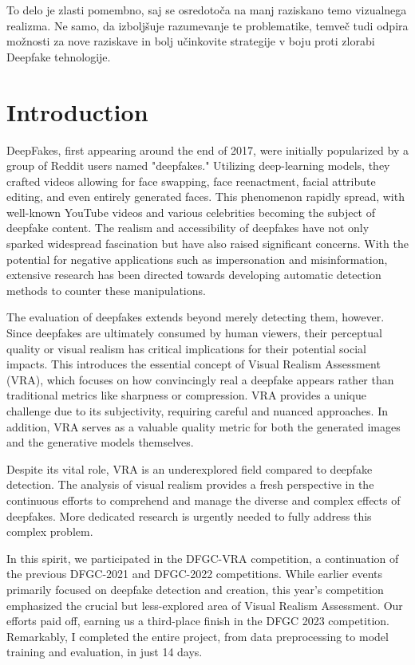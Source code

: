 \documentclass[a4paper,12pt,openright]{book}
\newcommand{\clearemptydoublepage}{\newpage{\pagestyle{empty}\cleardoublepage}}
\begin{document}
To delo je zlasti pomembno, saj se osredotoča na manj raziskano temo vizualnega realizma. Ne samo, da izboljšuje razumevanje te problematike, temveč tudi odpira možnosti za nove raziskave in bolj učinkovite strategije v boju proti zlorabi Deepfake tehnologije.


\bigskip

\clearemptydoublepage


\mainmatter
\setcounter{page}{1}
\pagestyle{fancy}

\chapter{Introduction}
\label{chap:introduction}
DeepFakes, first appearing around the end of 2017, were initially popularized by a group of Reddit users named "deepfakes." Utilizing deep-learning models, they crafted videos allowing for face swapping, face reenactment, facial attribute editing, and even entirely generated faces. This phenomenon rapidly spread, with well-known YouTube videos and various celebrities becoming the subject of deepfake content. The realism and accessibility of deepfakes have not only sparked widespread fascination but have also raised significant concerns. With the potential for negative applications such as impersonation and misinformation, extensive research has been directed towards developing automatic detection methods to counter these manipulations.

The evaluation of deepfakes extends beyond merely detecting them, however. Since deepfakes are ultimately consumed by human viewers, their perceptual quality or visual realism has critical implications for their potential social impacts. This introduces the essential concept of Visual Realism Assessment (VRA), which focuses on how convincingly real a deepfake appears rather than traditional metrics like sharpness or compression. VRA provides a unique challenge due to its subjectivity, requiring careful and nuanced approaches. In addition, VRA serves as a valuable quality metric for both the generated images and the generative models themselves.

Despite its vital role, VRA is an underexplored field compared to deepfake detection. The analysis of visual realism provides a fresh perspective in the continuous efforts to comprehend and manage the diverse and complex effects of deepfakes. More dedicated research is urgently needed to fully address this complex problem.

In this spirit, we participated in the DFGC-VRA competition, a continuation of the previous DFGC-2021 and DFGC-2022 competitions. While earlier events primarily focused on deepfake detection and creation, this year's competition emphasized the crucial but less-explored area of Visual Realism Assessment. Our efforts paid off, earning us a third-place finish in the DFGC 2023 competition.  Remarkably, I completed the entire project, from data preprocessing to model training and evaluation, in just 14 days.
\end{document}
